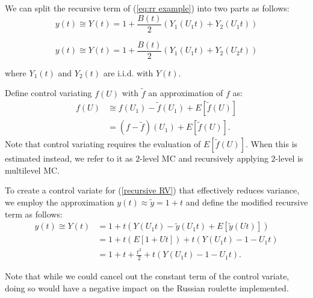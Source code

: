 \documentclass[a4paper,12pt]{article}
\begin{document}
\begin{example} \label{ex:splitting}
  We can split the recursive term of (\ref{eq:rr example})
  into two parts as follows:
  \begin{equation}\label{eq:splitting}
    y(t) \cong Y(t) =1 + \frac{B(t)}{2}(Y_{1}(U_{1}t) + Y_{2}(U_{1}t))
  \end{equation}


  \begin{equation}\label{eq:splitting2}
    y(t) \cong Y(t) =1 + \frac{B(t)}{2}(Y_{1}(U_{1}t) + Y_{2}(U_{2}t))
  \end{equation}


  where $Y_{1}(t)$ and $Y_{2}(t)$ are i.i.d. with $Y(t)$.
\end{example}

\begin{definition} \label{CV}
  Define control variating $f(U)$ with $\tilde{f}$ an approximation of $f$ as:
  \begin{align}
    f(U) & \cong f(U_{1})-\tilde{f}(U_{1}) + E[\tilde{f}(U)] \\
         & = (f-\tilde{f})(U_{1}) + E[\tilde{f}(U)]
    .
  \end{align}
  Note that control variating requires the evaluation of
  $E[\tilde{f}(U)]$.  When this is estimated instead, we refer to it as $2$-level MC
  and recursively applying $2$-level is multilevel MC.
\end{definition}


\begin{example} \label{ex:CV}
  To create a control variate for (\ref{recursive RV}) that
  effectively reduces variance, we employ the approximation
  $y(t) \approx \tilde{y} =1+t$ and define the modified recursive term as follows:
  \begin{align}
    y(t) \cong Y(t) & = 1 + t(Y(U_{1}t) - \tilde{y}(U_{1}t) + E[\tilde{y}(Ut)])     \\
                    & = 1 + t \left( E[1 + Ut]  \right) + t(Y(U_{1}t) - 1 - U_{1}t) \\
                    & = 1 + t + \frac{t^2}{2} + t(Y(U_{1}t) - 1 - U_{1}t).
  \end{align}


  Note that while we could cancel out the constant term
  of the control variate, doing so would have a negative impact
  on the Russian roulette implemented.
\end{example}
\end{document}
